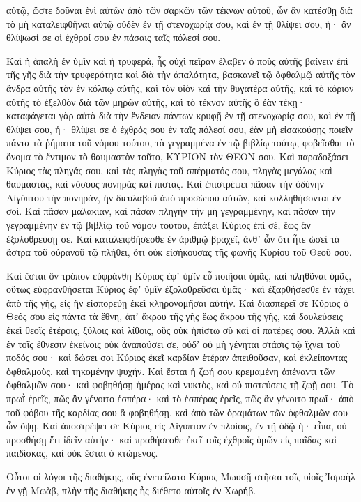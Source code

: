 {αὐτῷ, ὥστε δοῦναι ἑνὶ αὐτῶν ἀπὸ τῶν σαρκῶν τῶν τέκνων αὐτοῦ, ὧν ἂν κατέσθῃ διὰ τὸ μὴ καταλειφθῆναι αὐτῷ οὐδὲν ἐν τῇ στενοχωρίᾳ σου, καὶ ἐν τῇ θλίψει σου, ἡ· ἂν θλίψωσί σε οἱ ἐχθροί σου ἐν πάσαις ταῖς πόλεσί σου.
\par }{\PP {}Καὶ ἡ ἁπαλὴ ἐν ὑμῖν καὶ ἡ τρυφερά, ἧς οὐχὶ πεῖραν ἔλαβεν ὁ ποὺς αὐτῆς βαίνειν ἐπὶ τῆς γῆς διὰ τὴν τρυφερότητα καὶ διὰ τὴν ἁπαλότητα, βασκανεῖ τῷ ὀφθαλμῷ αὐτῆς τὸν ἄνδρα αὐτῆς τὸν ἐν κόλπῳ αὐτῆς, καὶ τὸν υἱὸν καὶ τὴν θυγατέρα αὐτῆς,
καὶ τὸ κόριον αὐτῆς τὸ ἐξελθὸν διὰ τῶν μηρῶν αὐτῆς, καὶ τὸ τέκνον αὐτῆς ὃ ἐὰν τέκῃ· καταφάγεται γὰρ αὐτὰ διὰ τὴν ἔνδειαν πάντων κρυφῇ ἐν τῇ στενοχωρίᾳ σου, καὶ ἐν τῇ θλίψει σου, ἡ· θλίψει σε ὁ ἐχθρός σου ἐν ταῖς πόλεσί σου,
ἐὰν μὴ εἰσακούσῃς ποιεῖν πάντα τὰ ῥήματα τοῦ νόμου τούτου, τὰ γεγραμμένα ἐν τῷ βιβλίῳ τούτῳ, φοβεῖσθαι τὸ ὄνομα τὸ ἔντιμον τὸ θαυμαστὸν τοῦτο, ΚΥΡΙΟΝ τὸν ΘΕΟΝ σου.
Καὶ παραδοξάσει Κύριος τὰς πληγάς σου, καὶ τὰς πληγὰς τοῦ σπέρματός σου, πληγὰς μεγάλας καὶ θαυμαστὰς, καὶ νόσους πονηρὰς καὶ πιστάς.
Καὶ ἐπιστρέψει πᾶσαν τὴν ὀδύνην Αἰγύπτου τὴν πονηρὰν, ἣν διευλαβοῦ ἀπὸ προσώπου αὐτῶν, καὶ κολληθήσονται ἐν σοί.
Καὶ πᾶσαν μαλακίαν, καὶ πᾶσαν πληγὴν τὴν μὴ γεγραμμένην, καὶ πᾶσαν τὴν γεγραμμένην ἐν τῷ βιβλίῳ τοῦ νόμου τούτου, ἐπάξει Κύριος ἐπὶ σέ, ἕως ἂν ἐξολοθρεύσῃ σε.
Καὶ καταλειφθήσεσθε ἐν ἀριθμῷ βραχεῖ, ἀνθʼ ὧν ὅτι ἦτε ὡσεὶ τὰ ἄστρα τοῦ οὐρανοῦ τῷ πλήθει, ὅτι οὐκ εἰσήκουσας τῆς φωνῆς Κυρίου τοῦ Θεοῦ σου.
\par }{\PP {}Καὶ ἔσται ὃν τρόπον εὐφράνθη Κύριος ἐφʼ ὑμῖν εὖ ποιῆσαι ὑμᾶς, καὶ πληθῦναι ὑμᾶς, οὕτως εὐφρανθήσεται Κύριος ἐφʼ ὑμῖν ἐξολοθρεῦσαι ὑμᾶς· καὶ ἐξαρθήσεσθε ἐν τάχει ἀπὸ τῆς γῆς, εἰς ἣν εἰσπορεύῃ ἐκεῖ κληρονομῆσαι αὐτήν.
Καὶ διασπερεῖ σε Κύριος ὁ Θεός σου εἰς πάντα τὰ ἔθνη, ἀπʼ ἄκρου τῆς γῆς ἕως ἄκρου τῆς γῆς, καὶ δουλεύσεις ἐκεῖ θεοῖς ἑτέροις, ξύλοις καὶ λίθοις, οὓς οὐκ ἠπίστω σὺ καὶ οἱ πατέρες σου.
Ἀλλὰ καὶ ἐν τοῖς ἔθνεσιν ἐκείνοις οὐκ ἀναπαύσει σε, οὐδʼ οὐ μὴ γένηται στάσις τῷ ἴχνει τοῦ ποδός σου· καὶ δώσει σοι Κύριος ἐκεῖ καρδίαν ἑτέραν ἀπειθοῦσαν, καὶ ἐκλείποντας ὀφθαλμοὺς, καὶ τηκομένην ψυχήν.
Καὶ ἔσται ἡ ζωή σου κρεμαμένη ἀπέναντι τῶν ὀφθαλμῶν σου· καὶ φοβηθήσῃ ἡμέρας καὶ νυκτὸς, καὶ οὐ πιστεύσεις τῇ ζωῇ σου.
Τὸ πρωῒ ἐρεῖς, πῶς ἂν γένοιτο ἑσπέρα· καὶ τὸ ἑσπέρας ἐρεῖς, πῶς ἂν γένοιτο πρωΐ· ἀπὸ τοῦ φόβου τῆς καρδίας σου ἃ φοβηθήσῃ, καὶ ἀπὸ τῶν ὁραμάτων τῶν ὀφθαλμῶν σου ὧν ὄψῃ.
Καὶ ἀποστρέψει σε Κύριος εἰς Αἴγυπτον ἐν πλοίοις, ἐν τῇ ὁδῷ ἡ· εἶπα, οὐ προσθήσῃ ἔτι ἰδεῖν αὐτήν· καὶ πραθήσεσθε ἐκεῖ τοῖς ἐχθροῖς ὑμῶν εἰς παῖδας καὶ παιδίσκας, καὶ οὐκ ἔσται ὁ κτώμενος.
\par }{\PP {}Οὗτοι οἱ λόγοι τῆς διαθήκης, οὓς ἐνετείλατο Κύριος Μωυσῇ στῆσαι τοῖς υἱοῖς Ἰσραὴλ ἐν γῇ Μωὰβ, πλὴν τῆς διαθήκης ἧς διέθετο αὐτοῖς ἐν Χωρήβ.

}
